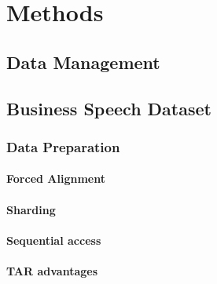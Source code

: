 \chapter{Methods}
\label{chapter:methods}


\section{Data Management}

\section{Business Speech Dataset}

\subsection{Data Preparation}
\subsubsection{Forced Alignment}
\subsubsection{Sharding}
\subsubsection{Sequential access}
\subsubsection{TAR advantages}
